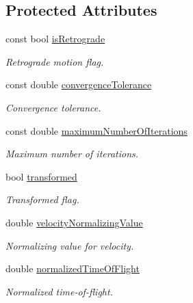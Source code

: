 \subsection*{Protected Attributes}
\begin{DoxyCompactItemize}
\item 
const bool \hyperlink{classtudat_1_1mission__segments_1_1ZeroRevolutionLambertTargeterIzzo_a1dd22e2d2ed5159ad02566429544946d}{is\+Retrograde}
\begin{DoxyCompactList}\small\item\em Retrograde motion flag. \end{DoxyCompactList}\item 
const double \hyperlink{classtudat_1_1mission__segments_1_1ZeroRevolutionLambertTargeterIzzo_a9fb8bc5f5b04c493d0b29f5ad4bd3565}{convergence\+Tolerance}
\begin{DoxyCompactList}\small\item\em Convergence tolerance. \end{DoxyCompactList}\item 
const double \hyperlink{classtudat_1_1mission__segments_1_1ZeroRevolutionLambertTargeterIzzo_afbdf81b1a06e92fe4fe0198dd3ca6877}{maximum\+Number\+Of\+Iterations}
\begin{DoxyCompactList}\small\item\em Maximum number of iterations. \end{DoxyCompactList}\item 
bool \hyperlink{classtudat_1_1mission__segments_1_1ZeroRevolutionLambertTargeterIzzo_a0151916d269a7449fbabe7693707cb70}{transformed}
\begin{DoxyCompactList}\small\item\em Transformed flag. \end{DoxyCompactList}\item 
double \hyperlink{classtudat_1_1mission__segments_1_1ZeroRevolutionLambertTargeterIzzo_a80c3e081aeae5eea4d18bf4ef4164f2d}{velocity\+Normalizing\+Value}
\begin{DoxyCompactList}\small\item\em Normalizing value for velocity. \end{DoxyCompactList}\item 
double \hyperlink{classtudat_1_1mission__segments_1_1ZeroRevolutionLambertTargeterIzzo_ab55d302f257841e2f4caf7e52f8955c4}{normalized\+Time\+Of\+Flight}
\begin{DoxyCompactList}\small\item\em Normalized time-\/of-\/flight. \end{DoxyCompactList}\item 

\end{DoxyCompactItemize}
